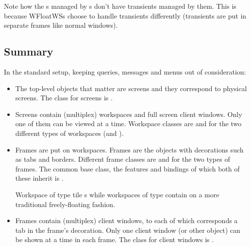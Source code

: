 Note how the s managed by s don't have
transients managed by them. This is because WFloatWSs choose to handle
transients differently (transients are put in separate frames like normal
windows).

\subsection{Summary}

In the standard setup, keeping queries, messages and menus out of
consideration:

\begin{itemize}
  \item The top-level objects that matter are screens and they correspond
    to physical screens. The class for screens is .
  \item Screens contain (multiplex) workspaces and full screen client
    windows. Only one of them can be viewed at a time.
    Workspace classes are  and  
    for the two different types of workspaces (and ).
  \item Frames are put on workspaces. Frames are the objects with 
    decorations such as tabs and borders.
    Different frame classes are  and 
    for the two types of frames. The common base class, the features and
    bindings of which both of these inherit is . 
    
    Workspace of type  tile s while
    workspaces of type  contain 
    on a more traditional freely-floating fashion.

  \item Frames contain (multiplex) client windows, to each of which
    corresponds a tab in the frame's decoration. Only one client
    window (or other object) can be shown at a time in each frame.
    The class for client windows is .
\end{itemize}

